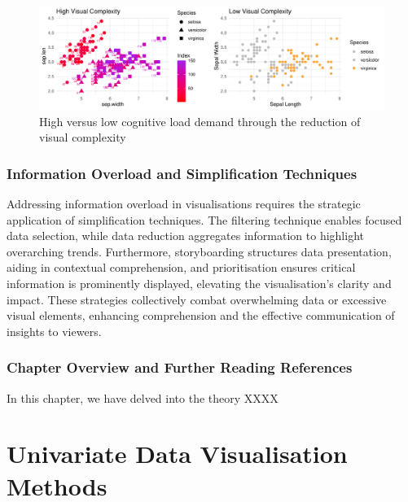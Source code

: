 \documentclass{article}\usepackage[]{graphicx}\usepackage[]{xcolor}
\makeatletter
\def\maxwidth{ %
  \ifdim\Gin@nat@width>\linewidth
    \linewidth
  \else
    \Gin@nat@width
  \fi
}
\newenvironment{knitrout}{}{} %
\numberwithin{equation}{section}
\makeatother
\begin{document}
\begin{knitrout}\scriptsize
{}\color{fgcolor}\begin{figure}[H]

{\centering \includegraphics[width=\maxwidth]{figure/beamer-cogload-plot-1} 

}

\caption[High versus low cognitive load demand through the reduction of visual complexity]{High versus low cognitive load demand through the reduction of visual complexity}\label{fig:cogload-plot}
\end{figure}

\end{knitrout}

\subsubsection{Information Overload and Simplification Techniques}
Addressing information overload in visualisations requires the strategic application of simplification techniques. The filtering technique enables focused data selection, while data reduction aggregates information to highlight overarching trends. Furthermore, storyboarding structures data presentation, aiding in contextual comprehension, and prioritisation ensures critical information is prominently displayed, elevating the visualisation's clarity and impact. These strategies collectively combat overwhelming data or excessive visual elements, enhancing comprehension and the effective communication of insights to viewers.\\

\subsubsection*{Chapter Overview and Further Reading References}

\noindent In this chapter, we have delved into the theory XXXX

\newpage

\section{Univariate Data Visualisation Methods}
\end{document}
